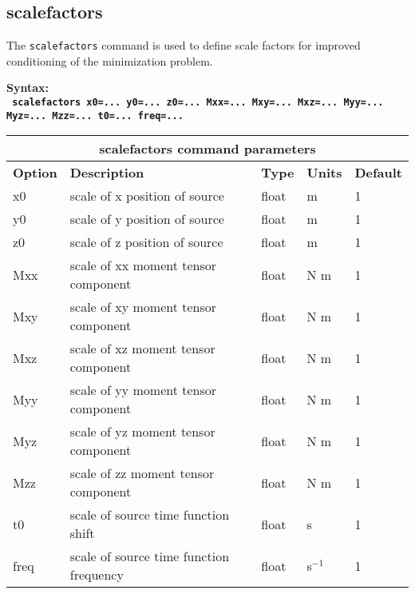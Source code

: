 \documentclass[11pt]{report}
\begin{document}
\subsection{scalefactors}
The \verb+scalefactors+ command is used to define scale factors for improved conditioning of the
minimization problem.
\begin{flushleft}
\bf
Syntax:\\
\tt
scalefactors x0=... y0=... z0=... Mxx=... Mxy=... Mxz=... Myy=... Myz=... Mzz=... t0=... freq=... 
\\
\end{flushleft}
%
\begin{center}
\begin{tabular}{|l|p{8cm}|l|l|l|} \hline
\multicolumn{5}{|c|}{\bf scalefactors command parameters }\\ \hline
\bf{Option} & \bf{Description} & \bf{Type} & \bf{Units} & \bf{Default} \\ \hline \hline
x0 & scale of x position of source & float & m & 1 \\ \hline
y0 & scale of y position of source & float & m & 1 \\ \hline
z0 & scale of z position of source & float & m & 1 \\ \hline
Mxx & scale of xx moment tensor component & float & N m  & 1 \\ \hline
Mxy & scale of xy moment tensor component & float & N m  & 1 \\ \hline
Mxz & scale of xz moment tensor component & float & N m  & 1 \\ \hline
Myy & scale of yy moment tensor component & float & N m  & 1 \\ \hline
Myz & scale of yz moment tensor component & float & N m  & 1 \\ \hline
Mzz & scale of zz moment tensor component & float & N m  & 1 \\ \hline
t0 & scale of source time function shift & float & s & 1 \\ \hline
freq & scale of source time function frequency & float & s$^{-1}$ & 1 \\ \hline
\end{tabular}
\end{center}
\end{document}
